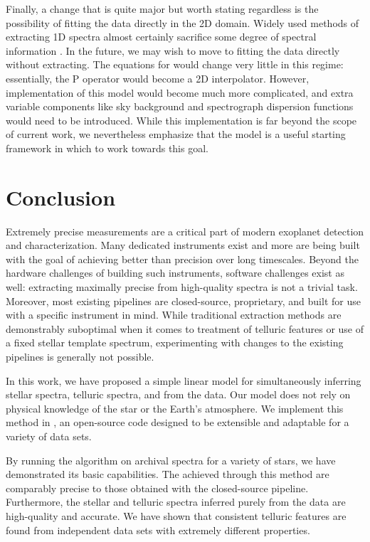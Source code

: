 \documentclass[modern]{aastex62}
\begin{document}
Finally, a change that is quite major but worth stating regardless is the possibility of fitting the data directly in the 2D domain.
Widely used methods of extracting 1D spectra almost certainly sacrifice some degree of spectral information \citep{Bolton2010}.
In the future, we may wish to move to fitting the data directly without extracting.
The equations for \wobble would change very little in this regime: essentially, the P operator would become a 2D interpolator.
However, implementation of this model would become much more complicated, and extra variable components like sky background and spectrograph dispersion functions would need to be introduced.
While this implementation is far beyond the scope of current work, we nevertheless emphasize that the \wobble model is a useful starting framework in which to work towards this goal.

\vspace{2cm}

\section{Conclusion}
\label{s:conclusion}

Extremely precise \RV measurements are a critical part of modern exoplanet detection and characterization.
Many dedicated \EPRV instruments exist and more are being built with the goal of achieving better than \ms precision over long timescales.
Beyond the hardware challenges of building such instruments, software challenges exist as well: extracting maximally precise \RVs from high-quality spectra is not a trivial task.
Moreover, most existing \EPRV pipelines are closed-source, proprietary, and built for use with a specific instrument in mind.
While traditional \RV extraction methods are demonstrably suboptimal when it comes to treatment of telluric features or use of a fixed stellar template spectrum, experimenting with changes to the existing pipelines is generally not possible.

In this work, we have proposed a simple linear model for simultaneously inferring stellar spectra, telluric spectra, and \RVs from the data.
Our model does not rely on physical knowledge of the star or the Earth's atmosphere.
We implement this method in \wobble, an open-source code designed to be extensible and adaptable for a variety of data sets.

By running the \wobble algorithm on archival \HARPS spectra for a variety of stars, we have demonstrated its basic capabilities.
The \RVs achieved through this method are comparably precise to those obtained with the closed-source \HARPS pipeline.
Furthermore, the stellar and telluric spectra inferred purely from the data are high-quality and accurate.
We have shown that consistent telluric features are found from independent data sets with extremely different properties.
\end{document}
